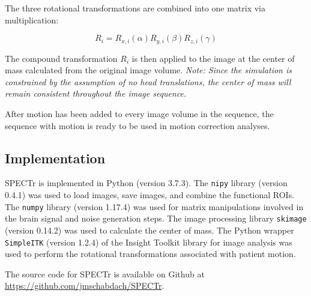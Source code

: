 The three rotational transformations are combined into one matrix via multiplication: 

\begin{equation}
R_i = R_{x, i}(\alpha) R_{y,i}(\beta) R_{z,i}(\gamma)
\end{equation}

The compound transformation $R_i$ is then applied to the image at the center of mass calculated from the original image volume. \textit{Note: Since the simulation is constrained by the assumption of no head translations, the center of mass will remain consistent throughout the image sequence.}

After motion has been added to every image volume in the sequence, the sequence with motion is ready to be used in motion correction analyses.

\subsection{Implementation}

SPECTr is implemented in Python (version 3.7.3). The \lstinline{nipy} library (version 0.4.1) was used to load images, save images, and combine the functional ROIs. The \lstinline{numpy} library (version 1.17.4) was used for matrix manipulations involved in the brain signal and noise generation steps. The image processing library \lstinline{skimage} (version 0.14.2) was used to calculate the center of mass. The Python wrapper \lstinline{SimpleITK} (version 1.2.4) of the Insight Toolkit library for image analysis was used to perform the rotational transformations associated with patient motion.

The source code for SPECTr is available on Github at \url{https://github.com/jmschabdach/SPECTr}.



